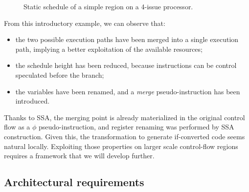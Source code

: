 \begin{figure}

\caption{Static schedule of a simple region on a 4-issue processor. }
\label{fig:example1}
\end{figure}

From this introductory example, we can observe that:
\begin{itemize}
\item the two possible execution paths have been merged into a single execution path, implying a  better exploitation of the available resources;  
\item the schedule height has been reduced, because instructions can be control speculated before the branch;
\item the variables have been renamed, and a \textit{merge} pseudo-instruction has been introduced.
\end{itemize}

Thanks to SSA, the merging point is already materialized in the original control flow as a $\phi$ pseudo-instruction, and register renaming was performed by SSA construction. 
Given this, the transformation to generate if-converted code seems natural locally. 
Exploiting those properties on larger scale control-flow regions requires a framework that we will develop further.

\subsection{Architectural requirements}

